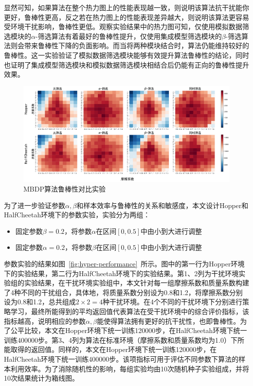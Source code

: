 显然可知，如果算法在整个热力图上的性能表现越一致，则说明该算法抗干扰能你更好，鲁棒性更高，反之若在热力图上的性能表现差异越大，则说明该算法更容易受环境干扰影响，鲁棒性更低。观察实验结果中的热力图可知，仅使用模拟数据筛选模块的$\alpha$-筛选算法有着最好的鲁棒性提升，仅使用集成模型筛选模块的$\beta$-筛选算法则会带来鲁棒性下降的负面影响。而当将两种模块结合时，算法仍能维持较好的鲁棒性。这一实验验证了模拟数据筛选模块能够有效提升算法鲁棒性的结论，同时也证明了集成模型筛选模块和模拟数据筛选模块相结合后仍能有正向的鲁棒性提升效果。

\begin{figure}[t]
  \centering
  \includegraphics[width=\textwidth]{figures/robustness-heatmap.pdf}
  \caption{MBDP算法鲁棒性对比实验}
  \label{fig:robustness-heatmap}
\end{figure}

为了进一步验证参数$\alpha,\beta$和样本效率与鲁棒性的关系和敏感度，本文设计Hopper和HalfCheetah环境下的参数实验，实验分为两组：

\begin{itemize}
    \item 固定参数$\beta=0.2$，将参数$\alpha$在区间$[0,0.5]$中由小到大进行调整
    \item 固定参数$\alpha=0.2$，将参数$\beta$在区间$[0,0.5]$中由小到大进行调整
\end{itemize}

参数实验的结果如图~\ref{fig:hyper-performance}~所示。图中的第一行为Hopper环境下的实验结果，第二行为HalfCheetah环境下的实验结果。第1、2列为干扰环境实验组的实验结果，在干扰环境实验组中，本文针对每一组摩擦系数和质量系数构建了4种不同的干扰组合，具体地，将质量系数分别设为0.8和1.2，将摩擦系数分别设为0.8和1.2，总共组成$2\times 2=4$种干扰环境。在4个不同的干扰环境下分别进行策略学习，最终所能得到的平均返回值代表算法在受干扰环境中的综合评价指标，该指标越高，说明相应的参数$\alpha,\beta$能使得算法拥有更好的抗干扰性，也即鲁棒性。为了公平比较，本文在Hopper环境下统一训练120000步，在HalfCheetah环境下统一训练400000步。第3、4列为算法在标准环境（摩擦系数和质量系数均为1.0）下所能取得的返回值。同样的，本文在Hopper环境下统一训练120000步，在HalfCheetah环境下统一训练400000步。该项指标可用于评估不同参数下算法的样本利用效率。为了消除随机性的影响，每组实验均由10次随机种子实验组成，并将10次结果统计为箱线图。

